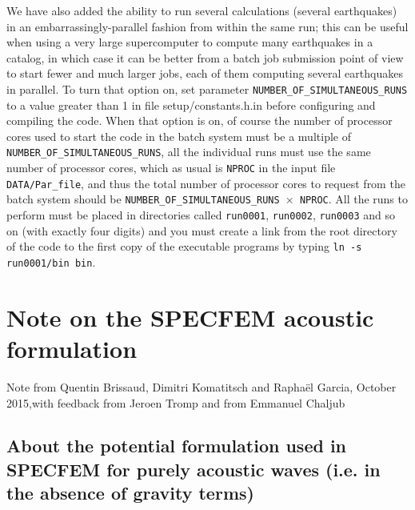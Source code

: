 We have also added the ability to run several calculations (several earthquakes)
in an embarrassingly-parallel fashion from within the same run;
this can be useful when using a very large supercomputer to compute
many earthquakes in a catalog, in which case it can be better from
a batch job submission point of view to start fewer and much larger jobs,
each of them computing several earthquakes in parallel.
To turn that option on, set parameter \texttt{NUMBER\_OF\_SIMULTANEOUS\_RUNS}
to a value greater than 1 in file setup/constants.h.in before
configuring and compiling the code.
When that option is on, of course the number of processor cores used to start
the code in the batch system must be a multiple of \texttt{NUMBER\_OF\_SIMULTANEOUS\_RUNS},
all the individual runs must use the same number of processor cores,
which as usual is \texttt{NPROC} in the input file \texttt{DATA/Par\_file},
and thus the total number of processor cores to request from the batch system
should be \texttt{NUMBER\_OF\_SIMULTANEOUS\_RUNS $\times$ NPROC}.
All the runs to perform must be placed in directories called \texttt{run0001}, \texttt{run0002}, \texttt{run0003} and so on (with exactly four digits)
and you must create a link from the root directory of the code
to the first copy of the executable programs by typing \texttt{ln -s run0001/bin bin}.



\chapter{Note on the SPECFEM acoustic formulation}

{\Large Note from Quentin Brissaud, Dimitri Komatitsch and Rapha\"el Garcia, October 2015,with feedback from Jeroen Tromp and from Emmanuel Chaljub}

\section{About the potential formulation used in SPECFEM for purely acoustic waves (i.e. in the absence of gravity terms)}

